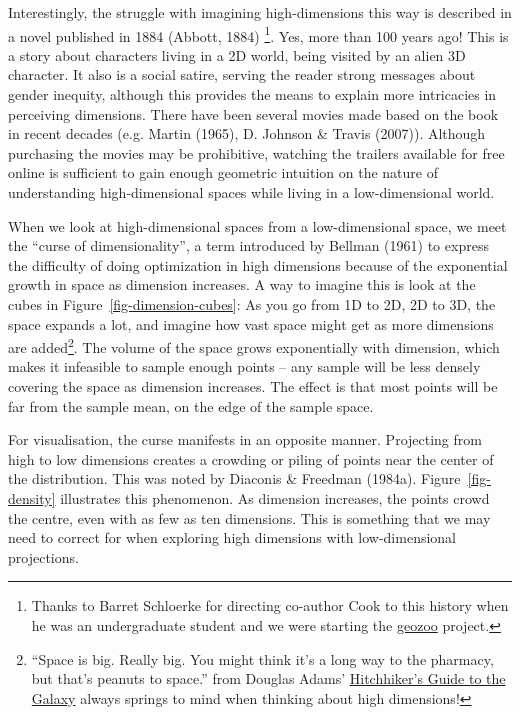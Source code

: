 \documentclass[
  letterpaper,
]{krantz}
\begin{document}
Interestingly, the struggle with imagining high-dimensions this way is
described in a novel published in 1884 (Abbott, 1884) \footnote{Thanks
  to Barret Schloerke for directing co-author Cook to this history when
  he was an undergraduate student and we were starting the
  \href{http://schloerke.com/geozoo/}{geozoo} project.}. Yes, more than
100 years ago! This is a story about characters living in a 2D world,
being visited by an alien 3D character. It also is a social satire,
serving the reader strong messages about gender inequity, although this
provides the means to explain more intricacies in perceiving dimensions.
There have been several movies made based on the book in recent decades
(e.g. Martin (1965), D. Johnson \& Travis (2007)). Although purchasing
the movies may be prohibitive, watching the trailers available for free
online is sufficient to gain enough geometric intuition on the nature of
understanding high-dimensional spaces while living in a low-dimensional
world.

When we look at high-dimensional spaces from a low-dimensional space, we
meet the ``curse of dimensionality'', a term introduced by Bellman
(1961) to express the difficulty of doing optimization in high
dimensions because of the exponential growth in space as dimension
increases. A way to imagine this is look at the cubes in
Figure~\ref{fig-dimension-cubes}: As you go from 1D to 2D, 2D to 3D, the
space expands a lot, and imagine how vast space might get as more
dimensions are added\footnote{``Space is big. Really big. You might
  think it's a long way to the pharmacy, but that's peanuts to space.''
  from Douglas Adams'
  \href{https://en.wikipedia.org/wiki/The_Hitchhiker\%27s_Guide_to_the_Galaxy\#Stage_shows}{Hitchhiker's
  Guide to the Galaxy} always springs to mind when thinking about high
  dimensions!}. The volume of the space grows exponentially with
dimension, which makes it infeasible to sample enough points -- any
sample will be less densely covering the space as dimension increases.
The effect is that most points will be far from the sample mean, on the
edge of the sample space.


For visualisation, the curse manifests in an opposite manner. Projecting
from high to low dimensions creates a crowding or piling of points near
the center of the distribution. This was noted by Diaconis \& Freedman
(1984a). Figure~\ref{fig-density} illustrates this phenomenon. As
dimension increases, the points crowd the centre, even with as few as
ten dimensions. This is something that we may need to correct for when
exploring high dimensions with low-dimensional projections.
\end{document}
